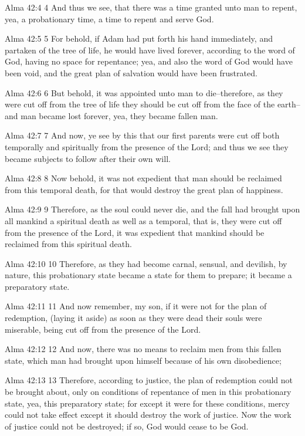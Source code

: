 Alma 42:4
 4 And thus we see, that there was a time granted unto man to
repent, yea, a probationary time, a time to repent and serve God.

Alma 42:5
 5 For behold, if Adam had put forth his hand immediately, and
partaken of the tree of life, he would have lived forever,
according to the word of God, having no space for repentance;
yea, and also the word of God would have been void, and the great
plan of salvation would have been frustrated.

Alma 42:6
 6 But behold, it was appointed unto man to die--therefore, as
they were cut off from the tree of life they should be cut off
from the face of the earth--and man became lost forever, yea,
they became fallen man.

Alma 42:7
 7 And now, ye see by this that our first parents were cut off
both temporally and spiritually from the presence of the Lord;
and thus we see they became subjects to follow after their own
will.

Alma 42:8
 8 Now behold, it was not expedient that man should be reclaimed
from this temporal death, for that would destroy the great plan
of happiness.

Alma 42:9
 9 Therefore, as the soul could never die, and the fall had
brought upon all mankind a spiritual death as well as a temporal,
that is, they were cut off from the presence of the Lord, it was
expedient that mankind should be reclaimed from this spiritual
death.

Alma 42:10
 10 Therefore, as they had become carnal, sensual, and devilish,
by nature, this probationary state became a state for them to
prepare; it became a preparatory state.

Alma 42:11
 11 And now remember, my son, if it were not for the plan of
redemption, (laying it aside) as soon as they were dead their
souls were miserable, being cut off from the presence of the
Lord.

Alma 42:12
 12 And now, there was no means to reclaim men from this fallen
state, which man had brought upon himself because of his own
disobedience;

Alma 42:13
 13 Therefore, according to justice, the plan of redemption could
not be brought about, only on conditions of repentance of men in
this probationary state, yea, this preparatory state; for except
it were for these conditions, mercy could not take effect except
it should destroy the work of justice. Now the work of justice
could not be destroyed; if so, God would cease to be God.

